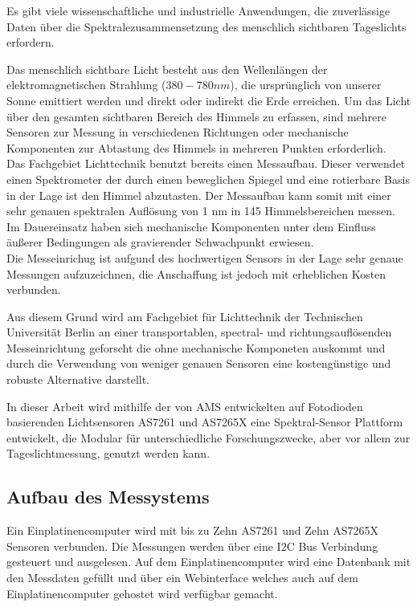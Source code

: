 Es gibt viele wissenschaftliche und industrielle Anwendungen, die zuverlässige Daten über die Spektralezusammensetzung des menschlich sichtbaren Tageslichts erfordern.

\noindent Das menschlich sichtbare Licht besteht aus den Wellenlängen der elektromagnetischen Strahlung ($380 - 780 nm$), die ursprünglich von unserer Sonne emittiert werden und direkt oder indirekt die Erde erreichen.
Um das Licht über den gesamten sichtbaren Bereich des Himmels zu erfassen, sind mehrere Sensoren zur Messung in verschiedenen Richtungen oder mechanische Komponenten zur Abtastung des Himmels in mehreren Punkten erforderlich.\\
Das Fachgebiet Lichttechnik benutzt bereits einen Messaufbau. Dieser verwendet einen Spektrometer der durch einen beweglichen Spiegel und eine rotierbare Basis in der Lage ist den Himmel abzutasten. 
Der Messaufbau kann somit mit einer sehr genauen spektralen Auflösung von 1 nm in 145 Himmelsbereichen messen.\\
Im Dauereinsatz haben sich mechanische Komponenten unter dem Einfluss äußerer Bedingungen als gravierender Schwachpunkt erwiesen.\\
 Die Messeinrichug ist aufgund des hochwertigen Sensors in der Lage sehr genaue Messungen aufzuzeichnen, die Anschaffung ist jedoch mit erheblichen Kosten verbunden.

\noindent Aus diesem Grund wird am Fachgebiet für Lichttechnik der Technischen Universität Berlin an einer transportablen, spectral- und richtungsauflösenden Messeinrichtung geforscht die ohne mechanische Komponeten auskommt und durch die Verwendung von weniger genauen Sensoren eine kostengünstige und robuste Alternative darstellt.

\noindent In dieser Arbeit wird mithilfe der von AMS entwickelten auf Fotodioden basierenden Lichtsensoren  AS7261 und AS7265X eine Spektral-Sensor Plattform entwickelt, die Modular für unterschiedliche Forschungszwecke, aber vor allem zur Tageslichtmessung, genutzt werden kann.


\subsection{Aufbau des Messystems}
Ein Einplatinencomputer wird mit bis zu Zehn AS7261 und Zehn AS7265X Sensoren verbunden.
Die Messungen werden über eine I2C Bus Verbindung gesteuert und ausgelesen.
Auf dem Einplatinencomputer  wird eine Datenbank mit den Messdaten gefüllt und über ein Webinterface welches auch auf dem Einplatinencomputer gehostet wird verfügbar gemacht.
